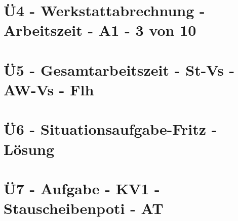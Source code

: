 \section{Ü4 - Werkstattabrechnung - Arbeitszeit - A1 - 3 von 10}\label{sec:U04-Werkstattabrechnung-Arbeitszeit_1-3_von10}
%
 \newpage

\section{Ü5 - Gesamtarbeitszeit - St-Vs - AW-Vs - Flh}\label{sec:U05-Gesamtarbeitszeit-StVs-AW-Vs-Flh}

 \newpage

\section{Ü6 - Situationsaufgabe-Fritz - Lösung}\label{sec:U06-Situationsaufgabe-Fritz-Loesung}
%
%
%


\section{Ü7 - Aufgabe - KV1 - Stauscheibenpoti - AT}\label{sec:U07-Aufgabe-KV1-Stauscheibenpoti-AT}



